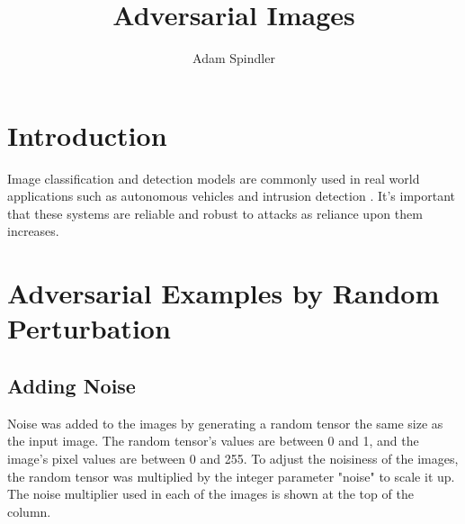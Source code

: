\documentclass{article}
\title{Adversarial Images}
\author{Adam Spindler}
\begin{document}
\maketitle

\section{Introduction}

Image classification and detection models are commonly used in real world applications such as autonomous vehicles \cite{CGV-079} and intrusion detection \cite{KIM2018845}. It's important that these systems are reliable and robust to attacks as reliance upon them increases.

\section{Adversarial Examples by Random Perturbation}

\subsection{Adding Noise}
Noise was added to the images by generating a random tensor the same size as the input image. The random tensor's values are between 0 and 1, and the image's pixel values are between 0 and 255. To adjust the noisiness of the images, the random tensor was multiplied by the integer parameter "noise" to scale it up. The noise multiplier used in each of the images is shown at the top of the column.
\end{document}
